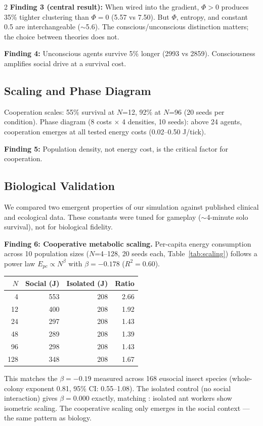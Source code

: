 \documentclass[letterpaper]{article}
\begin{document}
\begin{multicols}{2}
\textbf{Finding 3 (central result):} When wired into the gradient, $\Phi > 0$ produces 35\% tighter clustering than $\Phi = 0$ (5.57 vs 7.50). But $\Phi$, entropy, and constant 0.5 are interchangeable ($\sim$5.6). The conscious/unconscious distinction matters; the choice between theories does not.

\textbf{Finding 4:} Unconscious agents survive 5\% longer (2993 vs 2859). Consciousness amplifies social drive at a survival cost.

\subsection{Scaling and Phase Diagram}

Cooperation scales: 55\% survival at $N$=12, 92\% at $N$=96 (20 seeds per condition). Phase diagram (8 costs $\times$ 4 densities, 10 seeds): above 24 agents, cooperation emerges at all tested energy costs (0.02--0.50 J/tick).

\textbf{Finding 5:} Population density, not energy cost, is the critical factor for cooperation.

\subsection{Biological Validation}

We compared two emergent properties of our simulation against published clinical and ecological data. These constants were tuned for gameplay ($\sim$4-minute solo survival), not for biological fidelity.

\textbf{Finding 6: Cooperative metabolic scaling.} Per-capita energy consumption across 10 population sizes ($N$=4--128, 20 seeds each, Table~\ref{tab:scaling}) follows a power law $E_{pc} \propto N^{\beta}$ with $\beta = -0.178$ ($R^2 = 0.60$).

\begingroup
\centering
\small
{}
\label{tab:scaling}
\begin{tabular}{rrrr}
\toprule
$N$ & Social (J) & Isolated (J) & Ratio \\
\midrule
4 & 553 & 208 & 2.66 \\
12 & 400 & 208 & 1.92 \\
24 & 297 & 208 & 1.43 \\
48 & 289 & 208 & 1.39 \\
96 & 298 & 208 & 1.43 \\
128 & 348 & 208 & 1.67 \\
\bottomrule
\end{tabular}
\endgroup This matches the $\beta = -0.19$ measured across 168 eusocial insect species \citep{hou2010} (whole-colony exponent 0.81, 95\% CI: 0.55--1.08). The isolated control (no social interaction) gives $\beta = 0.000$ exactly, matching \citet{waters2010}: isolated ant workers show isometric scaling. The cooperative scaling only emerges in the social context --- the same pattern as biology.


\end{multicols}
\end{document}
